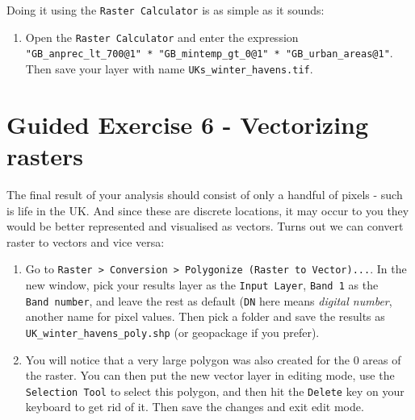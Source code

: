 \documentclass[
  letterpaper,
  DIV=11,
  numbers=noendperiod]{scrreprt}
\providecommand{\tightlist}{%
  \setlength{\itemsep}{0pt}\setlength{\parskip}{0pt}}\usepackage{longtable,booktabs,array}
\begin{document}
Doing it using the \texttt{Raster\ Calculator} is as simple as it
sounds:

\begin{enumerate}
\def\labelenumi{(\arabic{enumi})}
\setcounter{enumi}{177}
\tightlist
\item
  Open the \texttt{Raster\ Calculator} and enter the expression
  \texttt{"GB\_anprec\_lt\_700@1"\ *\ "GB\_mintemp\_gt\_0@1"\ *\ "GB\_urban\_areas@1"}.
  Then save your layer with name \texttt{UKs\_winter\_havens.tif}.
\end{enumerate}

\section{Guided Exercise 6 - Vectorizing
rasters}\label{guided-exercise-6---vectorizing-rasters}

The final result of your analysis should consist of only a handful of
pixels - such is life in the UK. And since these are discrete locations,
it may occur to you they would be better represented and visualised as
vectors. Turns out we can convert raster to vectors and vice versa:

\begin{enumerate}
\def\labelenumi{(\arabic{enumi})}
\setcounter{enumi}{178}
\item
  Go to
  \texttt{Raster\ \textgreater{}\ Conversion\ \textgreater{}\ Polygonize\ (Raster\ to\ Vector)...}.
  In the new window, pick your results layer as the
  \texttt{Input\ Layer}, \texttt{Band\ 1} as the \texttt{Band\ number},
  and leave the rest as default (\texttt{DN} here means \emph{digital
  number}, another name for pixel values. Then pick a folder and save
  the results as \texttt{UK\_winter\_havens\_poly.shp} (or geopackage if
  you prefer).
\item
  You will notice that a very large polygon was also created for the 0
  areas of the raster. You can then put the new vector layer in editing
  mode, use the \texttt{Selection\ Tool} to select this polygon, and
  then hit the \texttt{Delete} key on your keyboard to get rid of it.
  Then save the changes and exit edit mode.
\end{enumerate}
\end{document}
